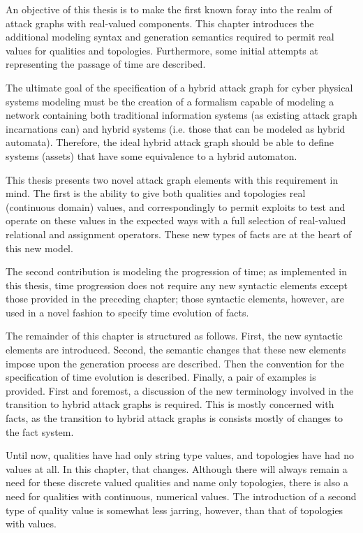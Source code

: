 An objective of this thesis is to make the first known foray into the realm of
attack graphs with real-valued components. This chapter introduces the additional
modeling syntax and generation semantics required to permit real values for
qualities and topologies. Furthermore, some initial attempts at representing
the passage of time are described. 

The ultimate goal of the specification of a hybrid attack graph for cyber
physical systems modeling must be the creation of a formalism capable of
modeling a network containing both traditional information systems (as
existing attack graph incarnations can) and hybrid systems (i.e. those that
can be modeled as hybrid automata). Therefore, the ideal hybrid attack graph
should be able to define systems (assets) that have some equivalence to a
hybrid automaton.

This thesis presents two novel attack graph elements with this requirement
in mind. The first is the ability to give both qualities and topologies
real (continuous domain) values, and correspondingly to permit exploits to
test and operate on these values in the expected ways with a full selection of
real-valued relational and assignment operators. These new types of facts are 
at the heart of this new model. 

The second contribution is modeling the progression
of time; as implemented in this thesis, time progression does not require any
new syntactic elements except those provided in the 
preceding chapter; those syntactic elements, however, are
used in a novel fashion to specify time evolution of facts.

The remainder of this chapter is structured as follows. First, the new
syntactic elements are introduced. Second, the semantic changes that these new
elements impose upon the generation process are described. Then the
convention for the specification of time evolution is described. 
Finally, a pair of examples is provided.
First and foremost, a discussion of the new terminology involved in the
transition to hybrid attack graphs is required. This is mostly concerned with
facts, as the transition to hybrid attack graphs is consists mostly of changes
to the fact system.

Until now, qualities have had only string type values, and
topologies have had no values at all. In this chapter, that changes. Although
there will always remain a need for these discrete valued qualities and name
only topologies, there is also a need for qualities with 
continuous, numerical values. The introduction of a second type of quality
value is somewhat less jarring, however, than that of topologies with
values.

